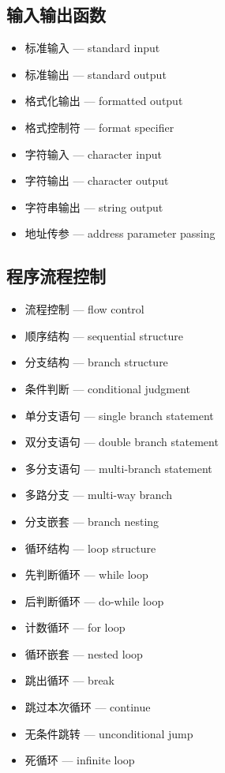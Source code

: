 \subsection{输入输出函数}
\begin{itemize}
\item 标准输入 — standard input
\item 标准输出 — standard output
\item 格式化输出 — formatted output
\item 格式控制符 — format specifier
\item 字符输入 — character input
\item 字符输出 — character output
\item 字符串输出 — string output
\item 地址传参 — address parameter passing
\end{itemize}

\subsection{程序流程控制}
\begin{itemize}
\item 流程控制 — flow control
\item 顺序结构 — sequential structure
\item 分支结构 — branch structure
\item 条件判断 — conditional judgment
\item 单分支语句 — single branch statement
\item 双分支语句 — double branch statement
\item 多分支语句 — multi-branch statement
\item 多路分支 — multi-way branch
\item 分支嵌套 — branch nesting
\item 循环结构 — loop structure
\item 先判断循环 — while loop
\item 后判断循环 — do-while loop
\item 计数循环 — for loop
\item 循环嵌套 — nested loop
\item 跳出循环 — break
\item 跳过本次循环 — continue
\item 无条件跳转 — unconditional jump
\item 死循环 — infinite loop
\end{itemize}

